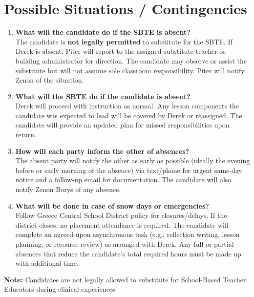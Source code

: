 \documentclass[10pt]{article}
\begin{document}
\section{Possible Situations / Contingencies}

\begin{enumerate}[leftmargin=*,itemsep=0.25em]
  \item \textbf{What will the candidate do if the SBTE is absent?}\\
        The candidate is \textbf{not legally permitted} to substitute for the SBTE. If Derek is absent, Piter will report to the assigned substitute teacher or building administrator for direction. The candidate may observe or assist the substitute but will not assume sole classroom responsibility. Piter will notify Zenon of the situation.

  \item \textbf{What will the SBTE do if the candidate is absent?}\\
        Derek will proceed with instruction as normal. Any lesson components the candidate was expected to lead will be covered by Derek or reassigned. The candidate will provide an updated plan for missed responsibilities upon return.

  \item \textbf{How will each party inform the other of absences?}\\
        The absent party will notify the other as early as possible (ideally the evening before or early morning of the absence) via text/phone for urgent same-day notice and a follow-up email for documentation. The candidate will also notify Zenon Borys of any absence.

  \item \textbf{What will be done in case of snow days or emergencies?}\\
        Follow Greece Central School District policy for closures/delays. If the district closes, no placement attendance is required. The candidate will complete an agreed-upon asynchronous task (e.g., reflection writing, lesson planning, or resource review) as arranged with Derek. Any full or partial absences that reduce the candidate's total required hours must be made up with additional time.
\end{enumerate}

\textbf{Note:} Candidates are not legally allowed to substitute for School-Based Teacher Educators during clinical experiences.


\end{document}
